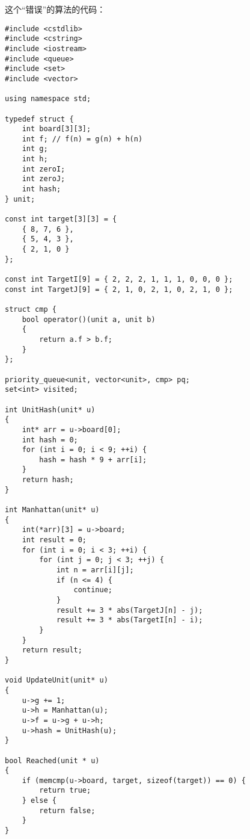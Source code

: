 \documentclass[UTF8,zihao=-4]{ctexart}
\begin{document}
\begin{itemize}
		这个``错误''的算法的代码：
		\begin{lstlisting}
#include <cstdlib>
#include <cstring>
#include <iostream>
#include <queue>
#include <set>
#include <vector>

using namespace std;

typedef struct {
    int board[3][3];
    int f; // f(n) = g(n) + h(n)
    int g;
    int h;
    int zeroI;
    int zeroJ;
    int hash;
} unit;

const int target[3][3] = {
    { 8, 7, 6 },
    { 5, 4, 3 },
    { 2, 1, 0 }
};

const int TargetI[9] = { 2, 2, 2, 1, 1, 1, 0, 0, 0 };
const int TargetJ[9] = { 2, 1, 0, 2, 1, 0, 2, 1, 0 };

struct cmp {
    bool operator()(unit a, unit b)
    {
        return a.f > b.f;
    }
};

priority_queue<unit, vector<unit>, cmp> pq;
set<int> visited;

int UnitHash(unit* u)
{
    int* arr = u->board[0];
    int hash = 0;
    for (int i = 0; i < 9; ++i) {
        hash = hash * 9 + arr[i];
    }
    return hash;
}

int Manhattan(unit* u)
{
    int(*arr)[3] = u->board;
    int result = 0;
    for (int i = 0; i < 3; ++i) {
        for (int j = 0; j < 3; ++j) {
            int n = arr[i][j];
            if (n <= 4) {
                continue;
            }
            result += 3 * abs(TargetJ[n] - j);
            result += 3 * abs(TargetI[n] - i);
        }
    }
    return result;
}

void UpdateUnit(unit* u)
{
    u->g += 1;
    u->h = Manhattan(u);
    u->f = u->g + u->h;
    u->hash = UnitHash(u);
}

bool Reached(unit * u)
{
    if (memcmp(u->board, target, sizeof(target)) == 0) {
        return true;
    } else {
        return false;
    }
}


\end{lstlisting}
\end{itemize}
\end{document}
